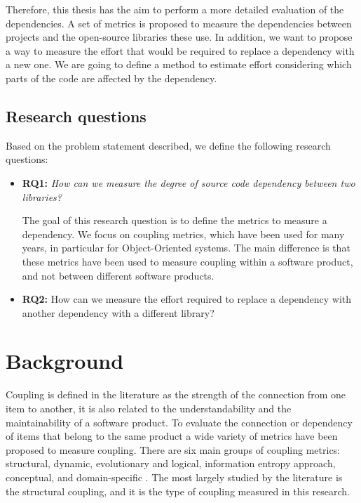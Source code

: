 \documentclass[a4paper]{article}
\begin{document}
Therefore, this thesis has the aim to perform a more detailed evaluation of the dependencies. A set of metrics is proposed to measure the dependencies between projects and the open-source libraries these use. In addition, we want to propose a way to measure the effort that would be required to replace a dependency with a new one. We are going to define a method to estimate effort considering which parts of the code are affected by the dependency.

\subsection{Research questions}
Based on the problem statement described, we define the following research questions:

\begin{itemize}[noitemsep]
  \item \textbf{RQ1:} \textit{How can we measure the degree of source code dependency between two libraries?}

  The goal of this research question is to define the metrics to measure a dependency. We focus on coupling metrics, which have been used for many years, in particular for Object-Oriented systems. The main difference is that these metrics have been used to measure coupling within a software product, and not between different software products.

  \item \textbf{RQ2:} How can we measure the effort required to replace a dependency with another dependency with a different library?
\end{itemize}

\section{Background}\label{section:Background}
Coupling is defined in the literature as the strength of the connection from one item to another, it is also related to the understandability and the maintainability of a software product. To evaluate the connection or dependency of items that belong to the same product a wide variety of metrics have been proposed to measure coupling.
There are six main groups of coupling metrics: structural, dynamic, evolutionary and logical, information entropy approach, conceptual, and domain-specific  \cite{poshyvanyk2006conceptual}. The most largely studied by the literature is the structural coupling, and it is the type of coupling measured in this research.
\end{document}
